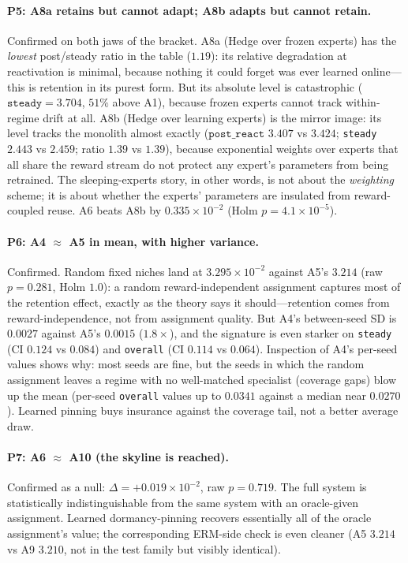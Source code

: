 \documentclass[11pt,a4paper]{article}
\theoremstyle{definition}
\theoremstyle{plain}
\begin{document}
\paragraph{P5: A8a retains but cannot adapt; A8b adapts but cannot retain.}
Confirmed on both jaws of the bracket. A8a (Hedge over frozen experts) has
the \emph{lowest} post/steady ratio in the table ($1.19$): its relative
degradation at reactivation is minimal, because nothing it could forget was
ever learned online---this is retention in its purest form. But its absolute
level is catastrophic ($\texttt{steady} = 3.704$, $51\%$ above A1), because
frozen experts cannot track within-regime drift at all. A8b (Hedge over
learning experts) is the mirror image: its level tracks the monolith almost
exactly ($\texttt{post\_react}$ $3.407$ vs $3.424$; \texttt{steady} $2.443$
vs $2.459$; ratio $1.39$ vs $1.39$), because exponential weights over
experts that all share the reward stream do not protect any expert's
parameters from being retrained. The sleeping-experts story, in other words,
is not about the \emph{weighting} scheme; it is about whether the experts'
parameters are insulated from reward-coupled reuse. A6 beats A8b by
$0.335\times 10^{-2}$ (Holm $p = 4.1\times 10^{-5}$).

\paragraph{P6: A4 $\approx$ A5 in mean, with higher variance.}
\label{sec:dd5-e1-a4}
Confirmed. Random fixed niches land at $3.295 \times 10^{-2}$ against A5's
$3.214$ (raw $p = 0.281$, Holm $1.0$): a random reward-independent
assignment captures most of the retention effect, exactly as the theory
says it should---retention comes from reward-independence, not from
assignment quality. But A4's between-seed SD is $0.0027$ against A5's
$0.0015$ ($1.8\times$), and the signature is even starker on
\texttt{steady} (CI $0.124$ vs $0.084$) and \texttt{overall} (CI $0.114$ vs
$0.064$). Inspection of A4's per-seed values shows why: most seeds are fine,
but the seeds in which the random assignment leaves a regime with no
well-matched specialist (coverage gaps) blow up the mean (per-seed
\texttt{overall} values up to $0.0341$ against a median near $0.0270$).
Learned pinning buys insurance against the coverage tail, not a better
average draw.

\paragraph{P7: A6 $\approx$ A10 (the skyline is reached).}
Confirmed as a null: $\Delta = +0.019 \times 10^{-2}$, raw $p = 0.719$. The
full system is statistically indistinguishable from the same system with an
oracle-given assignment. Learned dormancy-pinning recovers essentially all
of the oracle assignment's value; the corresponding ERM-side check is even
cleaner (A5 $3.214$ vs A9 $3.210$, not in the test family but visibly
identical).
\end{document}
